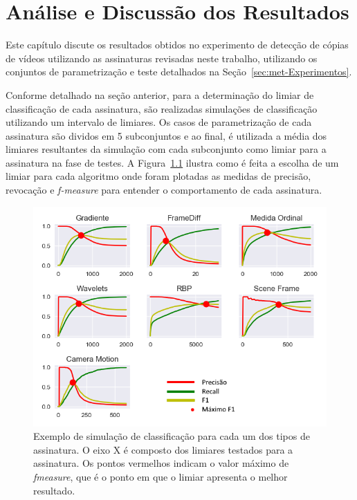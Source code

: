 
\chapter{Análise e Discussão dos Resultados}
\label{chap:resultados}

Este capítulo discute os resultados obtidos no experimento de detecção de cópias de vídeos utilizando as assinaturas revisadas neste trabalho, utilizando os conjuntos de parametrização e teste detalhados na Seção~\ref{sec:met-Experimentos}.

Conforme detalhado na seção anterior, para a determinação do limiar de classificação de cada assinatura, são realizadas simulações de classificação utilizando um intervalo de limiares. Os casos de parametrização de cada assinatura são dividos em 5 subconjuntos e ao final, é utilizada a média dos limiares resultantes da simulação com cada subconjunto como limiar para a assinatura na fase de testes. A Figura~\ref{fig:todos-limiares} ilustra como é feita a escolha de um limiar para cada algoritmo onde foram plotadas as medidas de precisão, revocação e \textit{f-measure} para entender o comportamento de cada assinatura.


\begin{figure}[h]
	\centering
	\caption{Exemplo de simulação de classificação para cada um dos tipos de assinatura. O eixo X é composto dos limiares testados para a assinatura. Os pontos vermelhos indicam o valor máximo de \textit{fmeasure}, que é o ponto em que o limiar apresenta o melhor resultado.}
	\label{fig:todos-limiares}
	\includegraphics[width=\textwidth]{dados/figuras/experimentos/todos_final.png}
\end{figure}

